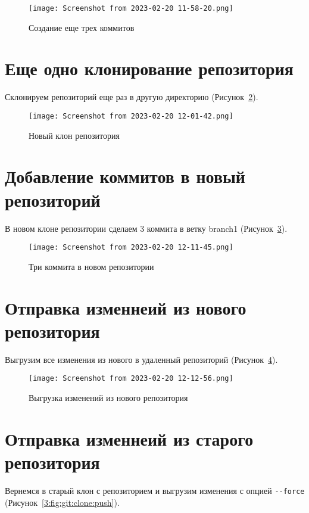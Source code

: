 \begin{figure}[h!tp]
	\centering
	\texttt{[image: Screenshot from 2023-02-20 11-58-20.png]}
	\caption{Создание еще трех коммитов}
	\label{3:fig:git:3commits}
\end{figure}

\section{Еще одно клонирование репозитория}
Склонируем репозиторий еще раз в другую директорию
(Рисунок~\ref{3:fig:git:clone:new}).

\begin{figure}[h!tp]
	\centering
	\texttt{[image: Screenshot from 2023-02-20 12-01-42.png]}
	\caption{Новый клон репозитория}
	\label{3:fig:git:clone:new}
\end{figure}

\section{Добавление коммитов в новый репозиторий}
В новом клоне репозитории сделаем 3 коммита в ветку branch1
(Рисунок~\ref{3:fig:git:clone:new:commits}).

\begin{figure}[h!tp]
	\centering
	\texttt{[image: Screenshot from 2023-02-20 12-11-45.png]}
	\caption{Три коммита в новом репозитории}
	\label{3:fig:git:clone:new:commits}
\end{figure}

\section{Отправка изменнеий из нового репозитория}
Выгрузим все изменения из нового в удаленный репозиторий
(Рисунок~\ref{3:fig:git:clone:new:push}).

\begin{figure}[h!tp]
	\centering
	\texttt{[image: Screenshot from 2023-02-20 12-12-56.png]}
	\caption{Выгрузка изменений из нового репозитория}
	\label{3:fig:git:clone:new:push}
\end{figure}

\section{Отправка изменнеий из старого репозитория}
Вернемся в старый клон с репозиторием и выгрузим изменения
с опцией \verb|--force| (Рисунок~\ref{3:fig:git:clone:push}).

